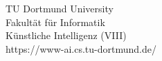 \begin{titlepage}
\vspace*{2.5cm}
\hspace*{\links}
\begin{minipage}[b]{8cm}
\raggedright
TU Dortmund University \\
Fakult\"at f\"ur Informatik\\
Künstliche Intelligenz (VIII)\\
https://www-ai.cs.tu-dortmund.de/
\end{minipage}
\end{titlepage}